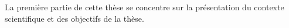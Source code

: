 La première partie de cette thèse se concentre sur la présentation du
contexte scientifique et des objectifs de la thèse.

